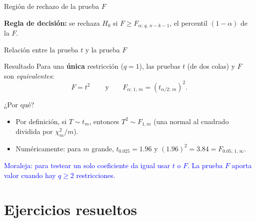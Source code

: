 \documentclass{beamer}
\begin{document}
\begin{frame}{Región de rechazo de la prueba $F$}
\begin{figure}
\centering
{}
\end{figure}
\textbf{Regla de decisión:} se rechaza $H_0$ si $F \geq F_{\alpha;\,q,\,n-k-1}$, el percentil $(1-\alpha)$ de la $F$.
\end{frame}

\begin{frame}{Relación entre la prueba $t$ y la prueba $F$}
\begin{alertblock}{Resultado}
Para una \textbf{única} restricción ($q=1$), las pruebas $t$ (de dos colas) y $F$ son \emph{equivalentes}:
\[
\boxed{\,F = t^2\,}
\qquad\text{y}\qquad
F_{\alpha;\,1,\,m} = \left(t_{\alpha/2;\,m}\right)^2 .
\]
\end{alertblock}
\begin{exampleblock}{¿Por qué?}
\begin{itemize}
    \item Por definición, si $T \sim t_m$, entonces $T^2 \sim F_{1,m}$ (una normal al cuadrado dividida por $\chi^2_m/m$).
    \item Numéricamente: para $m$ grande, $t_{0.025} = 1.96$ y $(1.96)^2 = 3.84 = F_{0.05;\,1,\infty}$.
\end{itemize}
\end{exampleblock}
\textcolor{blue}{Moraleja: para testear un solo coeficiente da igual usar $t$ o $F$. La prueba $F$ aporta valor cuando hay $q\geq 2$ restricciones.}
\end{frame}

\section{Ejercicios resueltos}
\end{document}
